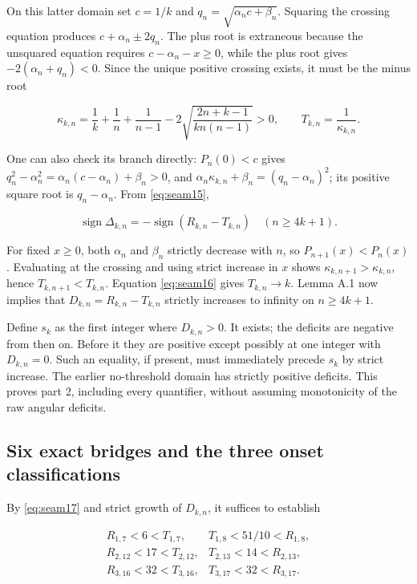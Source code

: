 On this latter domain set $c=1/k$ and
$q_n=\sqrt{\alpha_n c+\beta_n}$. Squaring the crossing equation
produces $c+\alpha_n\pm2q_n$. The plus root is extraneous because
the unsquared equation requires $c-\alpha_n-x\ge0$, while the plus
root gives $-2(\alpha_n+q_n)<0$. Since the unique positive crossing
exists, it must be the minus root

\[
 \kappa_{k,n}=\frac1k+\frac1n+\frac1{n-1}
 -2\sqrt{\frac{2n+k-1}{kn(n-1)}}>0,\qquad
 T_{k,n}=\frac1{\kappa_{k,n}}. \tag{A.16}\label{eq:seam16}
\]

One can also check its branch directly: $P_n(0)<c$ gives
$q_n^2-\alpha_n^2=\alpha_n(c-\alpha_n)+\beta_n>0$, and
$\alpha_n\kappa_{k,n}+\beta_n=(q_n-\alpha_n)^2$; its positive
square root is $q_n-\alpha_n$. From \eqref{eq:seam15},

\[
 \operatorname{sign}\Delta_{k,n}
 =-\operatorname{sign}(R_{k,n}-T_{k,n})\quad(n\ge4k+1).
 \tag{A.17}\label{eq:seam17}
\]

For fixed $x\ge0$, both $\alpha_n$ and $\beta_n$ strictly
decrease with $n$, so $P_{n+1}(x)<P_n(x)$. Evaluating at the
crossing and using strict increase in $x$ shows
$\kappa_{k,n+1}>\kappa_{k,n}$, hence $T_{k,n+1}<T_{k,n}$.
Equation \eqref{eq:seam16} gives $T_{k,n}\to k$. Lemma A.1 now implies that
$D_{k,n}=R_{k,n}-T_{k,n}$ strictly increases to infinity on
$n\ge4k+1$.

Define $s_k$ as the first integer where $D_{k,n}>0$. It exists;
the deficits are negative from then on. Before it they are positive except
possibly at one integer with $D_{k,n}=0$. Such an equality, if present,
must immediately precede $s_k$ by strict increase. The earlier
no-threshold domain has strictly positive deficits. This proves part 2,
including every quantifier, without assuming monotonicity of the raw
angular deficits.

\subsection{Six exact bridges and the three onset classifications}

By \eqref{eq:seam17} and strict growth of $D_{k,n}$, it suffices to establish

\[
\begin{array}{ll}
 R_{1,7}<6<T_{1,7}, & T_{1,8}<51/10<R_{1,8},\\
 R_{2,12}<17<T_{2,12}, & T_{2,13}<14<R_{2,13},\\
 R_{3,16}<32<T_{3,16}, & T_{3,17}<32<R_{3,17}.
\end{array} \tag{A.18}\label{eq:seam18}
\]


